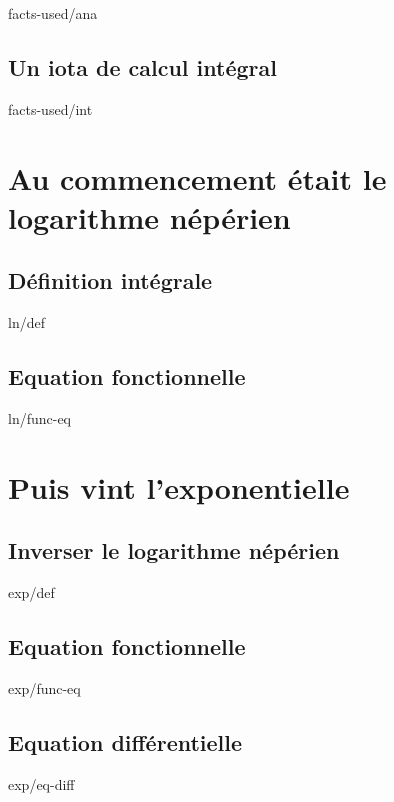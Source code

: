 \documentclass[12pt]{amsart}
\begin{document}
	{facts-used/ana}


	\subsection{Un iota de calcul intégral}

	{facts-used/int}




\section{Au commencement était le logarithme népérien}

	\subsection{Définition intégrale}

	{ln/def}


	\subsection{Equation fonctionnelle}

	{ln/func-eq}




\section{Puis vint l'exponentielle}

	\subsection{Inverser le logarithme népérien}

	{exp/def}


	\subsection{Equation fonctionnelle}

	{exp/func-eq}


	\subsection{Equation différentielle}

	{exp/eq-diff}
\end{document}
